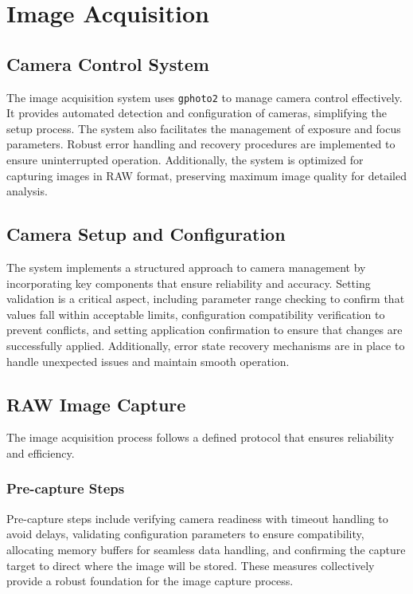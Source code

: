 \section{Image Acquisition}

\subsection{Camera Control System}
The image acquisition system uses \texttt{gphoto2} to manage camera control effectively. It provides automated detection and configuration of cameras, simplifying the setup process. The system also facilitates the management of exposure and focus parameters. Robust error handling and recovery procedures are implemented to ensure uninterrupted operation. Additionally, the system is optimized for capturing images in RAW format, preserving maximum image quality for detailed analysis.

\subsection{Camera Setup and Configuration}
The system implements a structured approach to camera management by incorporating key components that ensure reliability and accuracy. Setting validation is a critical aspect, including parameter range checking to confirm that values fall within acceptable limits, configuration compatibility verification to prevent conflicts, and setting application confirmation to ensure that changes are successfully applied. Additionally, error state recovery mechanisms are in place to handle unexpected issues and maintain smooth operation.

\subsection{RAW Image Capture}
The image acquisition process follows a defined protocol that ensures reliability and efficiency.

\subsubsection{Pre-capture Steps}
Pre-capture steps include verifying camera readiness with timeout handling to avoid delays, validating configuration parameters to ensure compatibility, allocating memory buffers for seamless data handling, and confirming the capture target to direct where the image will be stored. These measures collectively provide a robust foundation for the image capture process.

